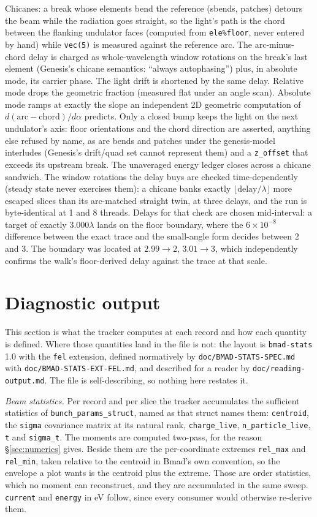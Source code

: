 \documentclass[11pt]{article}
\newcommand{\code}[1]{\texttt{#1}}
\begin{document}
Chicanes: a break whose elements bend the reference (sbends, patches) detours the
beam while the radiation goes straight, so the light's path is the chord between
the flanking undulator faces (computed from \code{ele\%floor}, never entered by
hand) while \code{vec(5)} is measured against the reference arc. The
arc-minus-chord delay is charged as whole-wavelength window rotations on the
break's last element (Genesis's chicane semantics: ``always autophasing'') plus,
in absolute mode, its carrier phase. The light drift is shortened by the same
delay. Relative mode drops the geometric fraction (measured flat under an angle
scan). Absolute mode ramps at exactly the slope an independent 2D geometric
computation of $d(\mathrm{arc}-\mathrm{chord})/d\alpha$ predicts. Only a closed
bump keeps the light on the next undulator's axis: floor orientations and the
chord direction are asserted, anything else refused by name, as are bends and
patches under the genesis-model interludes (Genesis's drift/quad set cannot
represent them) and a \code{z\_offset} that exceeds its upstream break. The
unaveraged energy ledger closes across a chicane sandwich. The window rotations the
delay buys are checked time-dependently (steady state never exercises them): a
chicane banks exactly $\lfloor \mathrm{delay}/\lambda \rfloor$ more escaped slices
than its arc-matched straight twin, at three delays, and the run is byte-identical
at 1 and 8 threads. Delays for that check are chosen mid-interval: a target of
exactly $3.000\lambda$ lands on the floor boundary, where the $6\times10^{-8}$
difference between the exact trace and the small-angle form decides between 2 and 3.
The boundary was located at $2.99 \to 2$, $3.01 \to 3$, which independently
confirms the walk's floor-derived delay against the trace at that scale.

\section{Diagnostic output}\label{sec:stats}

This section is what the tracker computes at each record and how each quantity is
defined. Where those quantities land in the file is not: the layout is
\code{bmad-stats} 1.0 with the \code{fel} extension, defined normatively by
\code{doc/BMAD-STATS-SPEC.md} with \code{doc/BMAD-STATS-EXT-FEL.md}, and described for
a reader by \code{doc/reading-output.md}. The file is self-describing, so nothing here
restates it.

\emph{Beam statistics.} Per record and per slice the tracker accumulates the
sufficient statistics of \code{bunch\_params\_struct}, named as that struct names
them: \code{centroid}, the \code{sigma} covariance matrix at its natural rank,
\code{charge\_live}, \code{n\_particle\_live}, \code{t} and \code{sigma\_t}. The
moments are computed two-pass, for the reason \S\ref{sec:numerics} gives. Beside them
are the per-coordinate extremes \code{rel\_max} and \code{rel\_min}, taken relative to
the centroid in Bmad's own convention, so the envelope a plot wants is the centroid
plus the extreme. Those are order statistics, which no moment can reconstruct, and
they are accumulated in the same sweep. \code{current} and \code{energy} in eV follow,
since every consumer would otherwise re-derive them.
\end{document}

